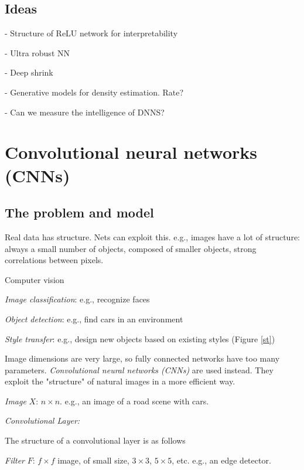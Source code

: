 \documentclass[english]{article}
\begin{document}
\eenum

\subsection{Ideas}
\benum
\item

- Structure of ReLU network for interpretability

- Ultra robust NN

- Deep shrink 

- Generative models for density estimation. Rate? 

- Can we measure the intelligence of DNNS? 
\eenum



\section{Convolutional neural networks (CNNs)}
\subsection{The problem and model}
\benum
\item Real data has structure. Nets can exploit this. e.g., images have a lot of structure: always a small number of objects, composed of smaller objects, strong correlations between pixels. 


Computer vision
\benum
\item \emph{Image classification}: e.g., recognize faces 
\item \emph{Object detection}: e.g., find cars in an environment
\item \emph{Style transfer}: e.g., design new objects based on existing styles (Figure \ref{st})

\eenum
Image dimensions are very large, so fully connected networks have too many parameters. \emph{Convolutional neural networks (CNNs)} are used instead. They exploit the "structure" of natural images in a more efficient way. 

\item \emph{Image} $X$: $n\times n$. e.g., an image of a road scene with cars.

\item \emph{Convolutional Layer:} 


The structure of a convolutional layer is as follows

\benum 
\item 
\emph{Filter} $F$: $ f\times f$ image, of small size, $3 \times 3$, $5 \times 5$, etc. e.g., an edge detector.
\end{document}
